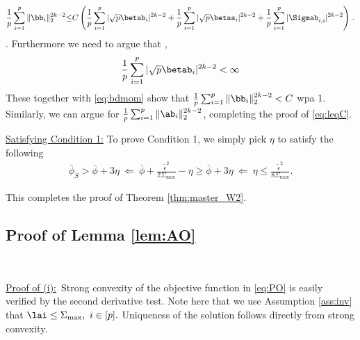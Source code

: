 \begin{align}
\frac{1}{p}\sum_{i=1}^p \|\bb_i\|_2^{2k-2} {\leq} C\left(\frac{1}{p}\sum_{i=1}^p |\sqrt{p}\betab_{i}|^{2k-2} + \frac{1}{p}\sum_{i=1}^p |\sqrt{p}\betas_{i}|^{2k-2} + \frac{1}{p}\sum_{i=1}^p |\Sigmab_{i,i}|^{2k-2} \right)\label{eq:bdmom}\,.
\end{align}
. {\color{red}Furthermore we need to argue that , 
\begin{align}
\frac{1}{p}\sum_{i=1}^p |\sqrt{p}\betab_{i}|^{2k-2} <\infty
\end{align}
}
These together with \eqref{eq:bdmom} show that $\frac{1}{p}\sum_{i=1}^p \|\bb_i\|_2^{2k-2}<C$ wpa 1. Similarly, we can argue for $\frac{1}{p}\sum_{i=1}^p \|\ab_i\|_2^{2k-2}$, completing the proof of \eqref{eq:leqC}.



\vspace{5pt}
\noindent\underline{Satisfying Condition 1:} To prove Condition 1, we simply pick $\eta$ to satisfy the following
\begin{align}
\bar\phi_S > \bar\phi + 3 \eta ~\Leftarrow~ \bar\phi + \frac{\tilde\epsilon^2}{2\Sigma_{\max}} - \eta \geq \bar\phi + 3 \eta ~\Leftarrow~ \eta \leq \frac{\tilde\epsilon^2}{8\Sigma_{\max}}.
\end{align}


This completes the proof of Theorem \ref{thm:master_W2}.

\subsection{Proof of Lemma \ref{lem:AO}}\label{sec:proofAO}

~~~~
~~~~

\vp
\noindent\underline{Proof of (i):}~Strong convexity of the objective function in \eqref{eq:PO} is easily verified by the second derivative test. Note here that we use Assumption \ref{ass:inv} that $\lai\leq\Sigma_{\max},~i\in[p].$ Uniqueness of the solution follows directly from strong convexity. 



